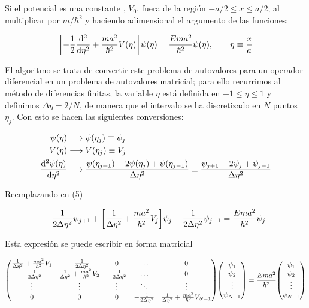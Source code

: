 \documentclass{article}
\begin{document}
Si el potencial es una constante , $V_0$, fuera de la región $-a/2\leq x\leq a/2$; al multiplicar por $m/\hbar^2$ y haciendo adimensional el argumento de las funciones:

\begin{equation}
    \qty[-\frac{1}{2}\dv[2]{\eta}+\frac{m a^2}{\hbar^2}V(\eta)]\psi(\eta)=\frac{E m a^2}{\hbar^2}\psi(\eta), \qquad \eta\equiv \frac{x}{a}
\end{equation}

El algoritmo se trata de convertir este problema de autovalores para un operador diferencial en un problema de autovalores matricial; para ello recurrimos al método de diferencias finitas, la variable $\eta$ está definida en $-1\leq \eta\leq1$ y definimos $\Delta\eta=2/N$, de manera que el intervalo se ha discretizado en $N$ puntos $\eta_j$. Con esto se hacen las siguientes conversiones:

\begin{equation}
\begin{split}
    \psi(\eta)&\longrightarrow\psi(\eta_j)\equiv\psi_j\\
    V(\eta)&\longrightarrow V(\eta_j)\equiv V_j\\
    \dv[2]{\psi(\eta)}{\eta}&\longrightarrow \frac{\psi(\eta_{j+1})-2\psi(\eta_j)+\psi(\eta_{j-1})}{\Delta \eta^2}\equiv\frac{\psi_{j+1}-2\psi_j+\psi_{j-1}}{\Delta \eta^2}
\end{split}
\end{equation}

Reemplazando en (5)

\begin{equation*}
    -\frac{1}{2\Delta \eta^2}\psi_{j+1}+\qty[\frac{1}{\Delta\eta^2}+\frac{m a^2}{\hbar^2}V_j]\psi_j-\frac{1}{2\Delta\eta^2}\psi_{j-1}=\frac{E m a^2}{\hbar^2}\psi_j
\end{equation*}

Esta expresión se puede escribir en forma matricial

\begin{equation}
    \mqty(\frac{1}{\Delta\eta^2}+\frac{m a^2}{\hbar^2}V_1 & -\frac{1}{2\Delta\eta^2} & 0 & \dots & 0\\
    -\frac{1}{2\Delta\eta^2} & \frac{1}{\Delta\eta^2}+\frac{m a^2}{\hbar^2}V_2 & -\frac{1}{2\Delta\eta^2} & \dots & 0\\
    \vdots & \vdots & \vdots & \ddots & \vdots\\
    0 & 0 & 0 & -\frac{1}{2\Delta\eta^2} & \frac{1}{\Delta\eta^2}+\frac{m a^2}{\hbar^2}V_{N-1})\mqty(\psi_1\\ \psi_2\\ \vdots \\ \psi_{N-1})=\frac{E m a^2}{\hbar^2}\mqty(\psi_1\\ \psi_2\\ \vdots \\ \psi_{N-1})
\end{equation}
\end{document}
